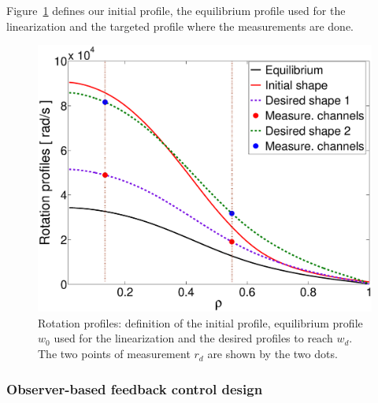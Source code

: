 \documentclass[12pt]{iopart}
\begin{document}
Figure~\ref{fig:rot11} defines our initial profile, the equilibrium profile used for the linearization and the targeted profile where the measurements are done.
\begin{figure}
	\centering
\includegraphics[width=\linewidth]{imene_figs/Goum133l}%
\caption{Rotation profiles: definition of the initial profile, equilibrium profile $w_0$ used for the linearization and the desired profiles to reach $w_d$. The two points of measurement $r_d$ are shown by the two dots.}
\label{fig:rot11}
\end{figure}




\subsubsection{Observer-based feedback control design} 
\end{document}
